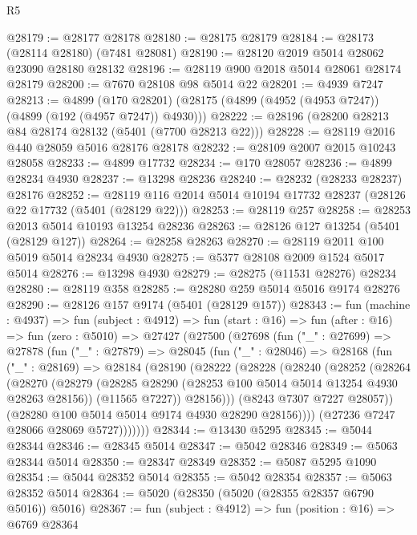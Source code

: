 \begin{lexlean}{R5}
\begin{coremodule}
@28179 := @28177 @28178
@28180 := @28175 @28179
@28184 := @28173 (@28114 @28180) (@7481 @28081)
@28190 := @28120 @2019 @5014 @28062 @23090 @28180 @28132
@28196 := @28119 @900 @2018 @5014 @28061 @28174 @28179
@28200 := @7670 @28108 @98 @5014 @22
@28201 := @4939 @7247
@28213 := @4899
    (@170 @28201)
    (@28175 (@4899 (@4952 (@4953 @7247)) (@4899 (@192 (@4957 @7247)) @4930)))
@28222 := @28196 (@28200 @28213 @84 @28174 @28132 (@5401 (@7700 @28213 @22)))
@28228 := @28119 @2016 @440 @28059 @5016 @28176 @28178
@28232 := @28109 @2007 @2015 @10243 @28058
@28233 := @4899 @17732
@28234 := @170 @28057
@28236 := @4899 @28234 @4930
@28237 := @13298 @28236
@28240 := @28232 (@28233 @28237) @28176
@28252 := @28119 @116 @2014 @5014 @10194 @17732 @28237 (@28126 @22 @17732 (@5401 (@28129 @22)))
@28253 := @28119 @257
@28258 := @28253 @2013 @5014 @10193 @13254 @28236
@28263 := @28126 @127 @13254 (@5401 (@28129 @127))
@28264 := @28258 @28263
@28270 := @28119 @2011 @100 @5019 @5014 @28234 @4930
@28275 := @5377 @28108 @2009 @1524 @5017 @5014
@28276 := @13298 @4930
@28279 := @28275 (@11531 @28276) @28234
@28280 := @28119 @358
@28285 := @28280 @259 @5014 @5016 @9174 @28276
@28290 := @28126 @157 @9174 (@5401 (@28129 @157))
@28343 := fun (machine : @4937) =>
  fun (subject : @4912) =>
  fun (start : @16) =>
  fun (after : @16) =>
  fun (zero : @5010) =>
  @27427
    (@27500
      (@27698
        (fun ("_" : @27699) =>
        @27878
          (fun ("_" : @27879) =>
          @28045
            (fun ("_" : @28046) =>
            @28168
              (fun ("_" : @28169) =>
              @28184
                (@28190
                  (@28222
                    (@28228
                      (@28240
                        (@28252
                          (@28264
                            (@28270
                              (@28279
                                (@28285 @28290 (@28253 @100 @5014 @5014 @13254 @4930 @28263 @28156))
                                (@11565 @7227))
                              @28156)))
                        (@8243 @7307 @7227 @28057))
                      (@28280 @100 @5014 @5014 @9174 @4930 @28290 @28156))))
                (@27236 @7247 @28066 @28069 @5727)))))))
@28344 := @13430 @5295
@28345 := @5044 @28344
@28346 := @28345 @5014
@28347 := @5042 @28346
@28349 := @5063 @28344 @5014
@28350 := @28347 @28349
@28352 := @5087 @5295 @1090
@28354 := @5044 @28352 @5014
@28355 := @5042 @28354
@28357 := @5063 @28352 @5014
@28364 := @5020 (@28350 (@5020 (@28355 @28357 @6790 @5016)) @5016)
@28367 := fun (subject : @4912) => fun (position : @16) => @6769 @28364

\end{coremodule}
\end{lexlean}
